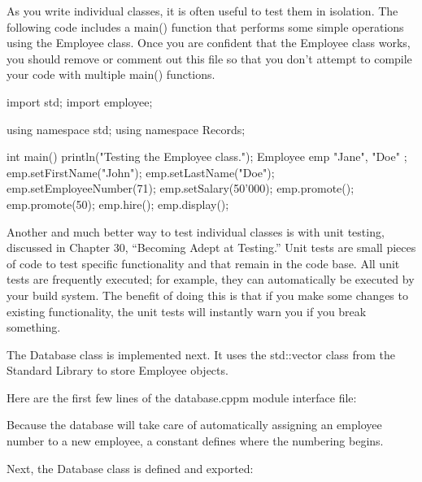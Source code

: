 
As you write individual classes, it is often useful to test them in isolation. The following code includes a main() function that performs some simple operations using the Employee class. Once you are confident that the Employee class works, you should remove or comment out this file so that you don’t attempt to compile your code with multiple main() functions.

\begin{cpp}
import std;
import employee;

using namespace std;
using namespace Records;

int main()
{
    println("Testing the Employee class.");
    Employee emp { "Jane", "Doe" };
    emp.setFirstName("John");
    emp.setLastName("Doe");
    emp.setEmployeeNumber(71);
    emp.setSalary(50'000);
    emp.promote();
    emp.promote(50);
    emp.hire();
    emp.display();
}
\end{cpp}

Another and much better way to test individual classes is with unit testing, discussed in Chapter 30, “Becoming Adept at Testing.” Unit tests are small pieces of code to test specific functionality and that remain in the code base. All unit tests are frequently executed; for example, they can automatically be executed by your build system. The benefit of doing this is that if you make some changes to existing functionality, the unit tests will instantly warn you if you break something.


The Database class is implemented next. It uses the std::vector class from the Standard Library to store Employee objects.


Here are the first few lines of the database.cppm module interface file:

\begin{cpp}
export module database;
import std;
import employee;

namespace Records {
    const int FirstEmployeeNumber { 1'000 };
\end{cpp}

Because the database will take care of automatically assigning an employee number to a new employee, a constant defines where the numbering begins.

Next, the Database class is defined and exported:

